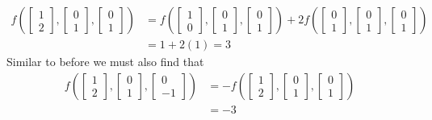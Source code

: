 \documentclass{report}
\begin{document}
$$
\begin{aligned}
f\left(\begin{bmatrix} 1 \\ 2 \end{bmatrix}, \begin{bmatrix} 0 \\ 1 \end{bmatrix}, \begin{bmatrix} 0 \\ 1 \end{bmatrix} \right) & =
f\left(\begin{bmatrix} 1 \\ 0 \end{bmatrix}, \begin{bmatrix} 0 \\ 1 \end{bmatrix}, \begin{bmatrix} 0 \\ 1 \end{bmatrix} \right) + 2f\left(\begin{bmatrix} 0 \\ 1 \end{bmatrix}, \begin{bmatrix} 0 \\ 1 \end{bmatrix}, \begin{bmatrix} 0 \\ 1 \end{bmatrix} \right) \\
& = 1 + 2(1) = 3
\end{aligned}
$$
Similar to before we must also find that
$$
\begin{aligned}
f\left(\begin{bmatrix} 1 \\ 2 \end{bmatrix}, \begin{bmatrix} 0 \\ 1 \end{bmatrix}, \begin{bmatrix} 0 \\ -1 \end{bmatrix} \right) & = 
-f\left(\begin{bmatrix} 1 \\ 2 \end{bmatrix}, \begin{bmatrix} 0 \\ 1 \end{bmatrix}, \begin{bmatrix} 0 \\ 1 \end{bmatrix} \right) \\
& = -3
\end{aligned}
$$
\end{document}
